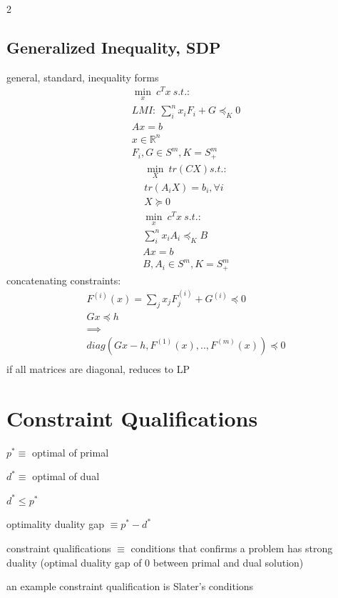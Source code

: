 \documentclass[8pt]{extarticle}
\newcommand{\R}{\mathbb{R}}
\begin{document}
\begin{multicols*}{2}
  \subsection*{Generalized Inequality, SDP}
  general, standard, inequality forms
  \begin{align*}
    \min_x\ c^Tx\ s.t.:\\
    LMI:\ \sum_i^n x_i F_i + G \preceq_K 0\\
    Ax=b\\
    x\in\R^n\\
    F_i,G \in S^m, K=S_+^m
  \end{align*}
  \begin{align*}
    \min_X\ tr(CX) s.t.:\\
    tr(A_iX)=b_i, \forall i\\
    X \succeq 0
  \end{align*}
  \begin{align*}
    \min_x\ c^Tx\ s.t.:\\
    \sum_i^n x_i A_i \preceq_K B\\
    Ax=b\\
    B,A_i \in S^m, K=S_+^m
  \end{align*}
  concatenating constraints:
  \begin{align*}
    F^{(i)}(x) = \sum_j x_j F_j^{(i)} + G^{(i)} \preceq 0\\
    Gx \preceq h\\
    \implies\\
    diag(Gx-h, F^{(1)}(x),..,F^{(m)}(x)) \preceq 0\\
  \end{align*}  
  if all matrices are diagonal, reduces to LP

  \vfill\null
  \pagebreak

  \section{Constraint Qualifications}

  $p^* \equiv$ optimal of primal
  
  $d^* \equiv$  optimal of dual

  $d^* \leq p^*$
  
  optimality duality gap $\equiv p^* - d^*$
  
  constraint qualifications $\equiv$ conditions that confirms a problem has strong duality (optimal duality gap of 0 between primal and dual solution)

  an example constraint qualification is Slater's conditions


\end{multicols*}
\end{document}
